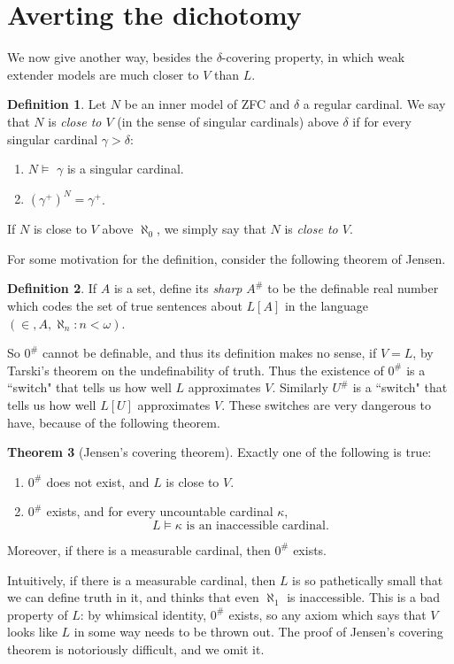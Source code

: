 \documentclass[12pt]{report}
\newcommand{\dfn}[1]{\emph{#1}\index{#1}}
\theoremstyle{definition}
\newtheorem{theorem}{Theorem}[chapter]
\newtheorem{definition}[theorem]{Definition}
\begin{document}
\section{Averting the dichotomy}
We now give another way, besides the $\delta$-covering property, in which weak extender models are much closer to $V$ than $L$.
\begin{definition}
Let $N$ be an inner model of ZFC and $\delta$ a regular cardinal.
We say that $N$ is \dfn{close to $V$} (in the sense of singular cardinals) above $\delta$ if for every singular cardinal $\gamma > \delta$:
\begin{enumerate}
\item $N \models $ $\gamma$ is a singular cardinal.
\item $(\gamma^+)^N = \gamma^+$.
\end{enumerate}
If $N$ is close to $V$ above $\aleph_0$, we simply say that $N$ is \dfn{close to $V$}.
\end{definition}
For some motivation for the definition, consider the following theorem of Jensen.
\begin{definition}
If $A$ is a set, define its \dfn{sharp} $A^{\#}$ to be the definable real number which codes the set of true sentences about $L[A]$ in the language $(\in, A, \aleph_n : n < \omega)$.
\end{definition}
So $0^{\#}$ cannot be definable, and thus its definition makes no sense, if $V = L$, by Tarski's theorem on the undefinability of truth.
Thus the existence of $0^{\#}$ is a ``switch" that tells us how well $L$ approximates $V$.
Similarly $U^{\#}$ is a ``switch" that tells us how well $L[U]$ approximates $V$.
These switches are very dangerous to have, because of the following theorem.
\begin{theorem}[Jensen's covering theorem]
Exactly one of the following is true:
\begin{enumerate}
\item $0^{\#}$ does not exist, and $L$ is close to $V$.
\item $0^{\#}$ exists, and for every uncountable cardinal $\kappa$,
$$L \models \text{$\kappa$ is an inaccessible cardinal}.$$
\end{enumerate}
Moreover, if there is a measurable cardinal, then $0^{\#}$ exists.
\end{theorem}
Intuitively, if there is a measurable cardinal, then $L$ is so pathetically small that we can define truth in it, and thinks that even $\aleph_1$ is inaccessible.
This is a bad property of $L$: by whimsical identity, $0^{\#}$ exists, so any axiom which says that $V$ looks like $L$ in some way needs to be thrown out.
The proof of Jensen's covering theorem is notoriously difficult, and we omit it.
\end{document}
